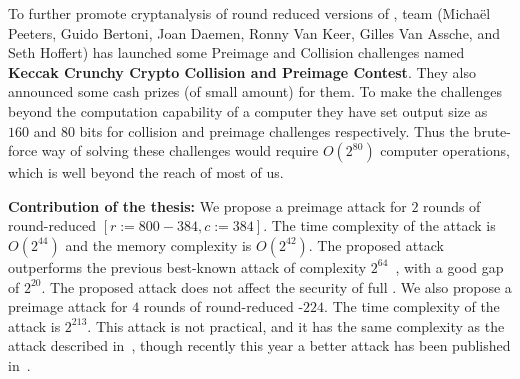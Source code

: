 \newpage
To further promote cryptanalysis of round reduced versions of \KECCAK{}, \KECCAK{} team (Michaël Peeters, Guido Bertoni, Joan Daemen, Ronny Van Keer, Gilles Van Assche, and Seth Hoffert) has launched some Preimage and Collision challenges named \textbf{Keccak Crunchy Crypto Collision and Preimage Contest}. 
They also announced some cash prizes (of small amount) for them. To make the challenges beyond the computation capability of a computer they have set output size as $160$ and $80$ bits for collision and preimage challenges respectively. Thus the brute-force way of solving these challenges would require $O(2^{80})$ computer operations, which is well beyond the reach of most of us.
\newline

\textbf{Contribution of the thesis:} We propose a preimage attack for $2$ rounds of round-reduced \KECCAK{}$[r:=800-384, c:=384]$. The time complexity of the attack is $O(2^{44})$ and the memory complexity is $O(2^{42})$. The proposed attack outperforms the previous best-known attack of complexity $2^{64}$~\cite{guo2016linear}, with a good gap of $2^{20}$. The proposed attack does not affect the security of full \KECCAK{}. We also propose a preimage attack for $4$ rounds of round-reduced \KECCAK-$224$. The time complexity of the attack is $2^{213}$. This attack is not practical, and it has the same complexity as the attack described in~\cite{guo2016linear}, though recently this year a better attack has been published in~\cite{lipreimage}.
